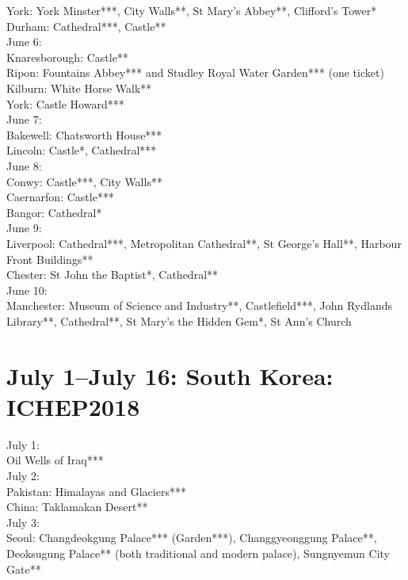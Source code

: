 York: York Minster***, City Walls**, St Mary's Abbey**, Clifford's Tower*\\
Durham: Cathedral***, Castle**\\

June 6:\\
Knaresborough: Castle**\\
Ripon: Fountains Abbey*** and Studley Royal Water Garden*** (one ticket)\\
Kilburn: White Horse Walk**\\
York: Castle Howard***\\

June 7:\\
Bakewell: Chatsworth House***\\
Lincoln: Castle*, Cathedral***\\

June 8:\\
Conwy: Castle***, City Walls**\\
Caernarfon: Castle***\\
Bangor: Cathedral*\\

June 9:\\
Liverpool: Cathedral***, Metropolitan Cathedral**, St George's Hall**, Harbour Front Buildings**\\
Chester: St John the Baptist*, Cathedral**\\

June 10:\\
Manchester: Museum of Science and Industry**, Castlefield***, John Rydlands Library**, Cathedral**, St Mary's the Hidden Gem*, St Ann's Church

\section{July 1--July 16: South Korea: ICHEP2018}
\label{Korea2018}

July 1:\\
Oil Wells of Iraq***\\

July 2:\\
Pakistan: Himalayas and Glaciers***\\
China: Taklamakan Desert**\\

July 3:\\
Seoul: Changdeokgung Palace*** (Garden***), Changgyeonggung Palace**, Deoksugung Palace** (both traditional and modern palace), Sungnyemun City Gate**\\

